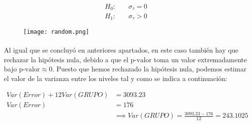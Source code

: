\documentclass{article}
\begin{document}
      \begin{align*}
        H_0:&\quad \sigma_\tau = 0 \\
        H_1:&\quad \sigma_\tau > 0
      \end{align*}

      \begin{figure}[H]
        \centering
        \texttt{[image: random.png]}
      \end{figure}

      \paragraph{}
      Al igual que se concluyó en anteriores apartados, en este caso también hay que rechazar la hipótesis nula, debido a que el $\text{p-valor}$ toma un valor extremadamente bajo $\text{p-valor}\approx 0$. Puesto que hemos rechazado la hipótesis nula, podemos estimar el valor de la varianza entre los niveles tal y como se indica a continuación:

      \begin{align*}
        Var(Error) + 12 Var(GRUPO) &= 3093.23\\
        Var(Error) &= 176 \\
        &\implies Var(GRUPO) = \frac{3093.23 - 176}{12} = 243.1025
      \end{align*}
\end{document}
